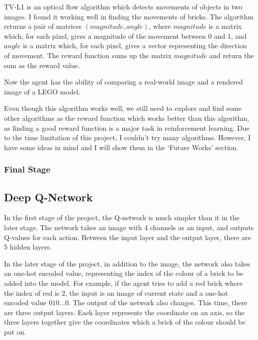 \documentclass[a4paper]{article}
\begin{document}
        		TV-L1 is an optical flow algorithm which detects movements of objects in two images. I found it working well in finding the movements of bricks. The algorithm returns a pair of matrices $(magnitude, angle)$, where $magnitude$ is a matrix which, for each pixel, gives a magnitude of the movement between 0 and 1, and $angle$ is a matrix which, for each pixel, gives a vector representing the direction of movement. The reward function sums up the matrix $magnitude$ and return the sum as the reward value. 
        		
        		Now the agent has the ability of comparing a real-world image and a rendered image of a LEGO model. 
        		
        		Even though this algorithm works well, we still need to explore and find some other algorithms as the reward function which works better than this algorithm, as finding a good reward function is a major task in reinforcement learning. Due to the time limitation of this project, I couldn't try many algorithms. However, I have some ideas in mind and I will show them in the `Future Works' section. 
        		
        	\subsubsection{Final Stage}
        		
        
        \subsection{Deep Q-Network}
            
            In the first stage of the project, the Q-network is much simpler than it in the later stage. The network takes an image with 4 channels as an input, and outputs Q-values for each action. Between the input layer and the output layer, there are 5 hidden layers. 
            
            In the later stage of the project, in addition to the image, the network also takes an one-hot encoded value, representing the index of the colour of a brick to be added into the model. For example, if the agent tries to add a red brick where the index of red is 2, the input is an image of current state and a one-hot encoded value $010...0$. The output of the network also changes. This time, there are three output layers. Each layer represents the coordinate on an axis, so the three layers together give the coordinates which a brick of the colour should be put on. 
        
\end{document}
